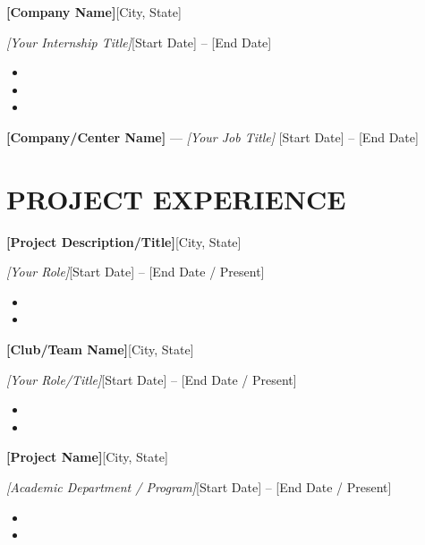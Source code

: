\documentclass[10pt,letterpaper]{article}
\newenvironment{resumeentrywide}[4]{%
\vspace{1pt}\textbf{#1}\hfill {\small #2}\par
\textit{#3}\hfill {\small #4}\par
}{\vspace{0pt}}
\begin{document}
\begin{resumeentrywide}
{[Company Name]}{[City, State]}
{[Your Internship Title]}{[Start Date] – [End Date]}
\end{resumeentrywide}
\begin{itemize}
\item 
\item 
\item 
\end{itemize}
\vspace{6pt}

\textbf{[Company/Center Name]} — \textit{[Your Job Title]} \hfill {\small [Start Date] – [End Date]}
\vspace{6pt}

\section*{PROJECT EXPERIENCE}

\begin{resumeentrywide}
{[Project Description/Title]}{[City, State]}
{[Your Role]}{[Start Date] – [End Date / Present]}
\end{resumeentrywide}
\begin{itemize}
    \item 
    \item 
\end{itemize}
\vspace{6pt}

\begin{resumeentrywide}
{[Club/Team Name]}{[City, State]}
{[Your Role/Title]}{[Start Date] – [End Date / Present]}
\end{resumeentrywide}
\begin{itemize}
    \item 
    \item 
\end{itemize}
\vspace{6pt}

\begin{resumeentrywide}
{[Project Name]}{[City, State]}
{[Academic Department / Program]}{[Start Date] – [End Date / Present]}
\end{resumeentrywide}
\begin{itemize}
    \item 
    \item 
\end{itemize}
\vspace{6pt}
\end{document}
